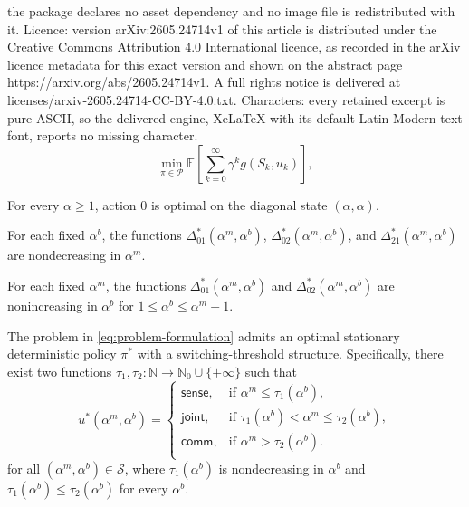 \documentclass[10pt,a4paper]{amsart}
\begin{document}
the package declares no asset dependency and no image file is redistributed with it. Licence: version arXiv:2605.24714v1 of this article is distributed under the Creative Commons Attribution 4.0 International licence, as recorded in the arXiv licence metadata for this exact version and shown on the abstract page https://arxiv.org/abs/2605.24714v1. A full rights notice is delivered at licenses/arxiv-2605.24714-CC-BY-4.0.txt. Characters: every retained excerpt is pure ASCII, so the delivered engine, XeLaTeX with its default Latin Modern text font, reports no missing character.
\begin{equation}
	\min_{\pi \in \mathcal P} \mathbb{E}\left[\sum_{k=0}^{\infty} \gamma^k g(S_k,u_k)\right],
	\label{eq:problem-formulation}
\end{equation}

\begin{lemma}\label{lemma:ordered-cost-diagonal-zero}
For every $\alpha\geq 1$, action $0$ is optimal on the diagonal state $(\alpha,\alpha)$.
\end{lemma}

\begin{lemma}\label{lemma:delta-non-decreasing-in-a_s}
For each fixed $\alpha^b$, the functions $\Delta^*_{01}(\alpha^m,\alpha^b)$, $\Delta^*_{02}(\alpha^m,\alpha^b)$, and $\Delta^*_{21}(\alpha^m,\alpha^b)$ are nondecreasing in $\alpha^m$.
\end{lemma}

\begin{lemma}\label{lemma:delta-non-increasing-in-a_b}
For each fixed $\alpha^m$, the functions $\Delta^*_{01}(\alpha^m,\alpha^b)$ and $\Delta^*_{02}(\alpha^m,\alpha^b)$ are nonincreasing in $\alpha^b$ for $1\leq \alpha^b\leq \alpha^m-1$.
\end{lemma}

\begin{theorem}\label{th:policy-structure}
The problem in \eqref{eq:problem-formulation} admits an optimal stationary deterministic policy $\pi^*$ with a switching-threshold structure. Specifically, there exist two functions $\tau_1, \tau_2 : \mathbb{N}\rightarrow\mathbb{N}_0\cup\{+\infty\}$ such that
\[
u^*(\alpha^m,\alpha^b)=
\begin{cases}
	\mathsf{sense,} & \text{if } \alpha^m\leq\tau_1(\alpha^b),\\
	\mathsf{joint,} & \text{if } \tau_1(\alpha^b)<\alpha^m\leq\tau_2(\alpha^b),\\
	\mathsf{comm,} & \text{if } \alpha^m>\tau_2(\alpha^b).\\
\end{cases}
\]
for all $(\alpha^m,\alpha^b)\in\mathcal{S}$, where $\tau_1(\alpha^b)$ is nondecreasing in $\alpha^b$ and $\tau_1(\alpha^b)\leq\tau_2(\alpha^b)$ for every $\alpha^b$.
\end{theorem}
\end{document}
